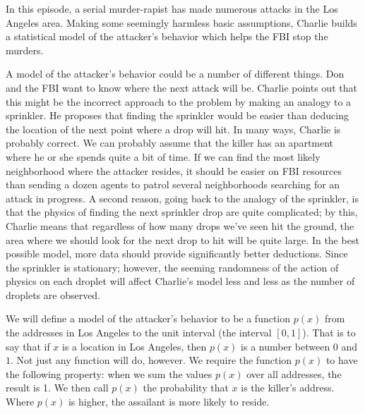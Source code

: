 \newpage
{}
{}
\setcounter{activity}{0}

In this episode, a serial murder-rapist has made numerous attacks in the Los Angeles area. Making some seemingly harmless basic assumptions, Charlie builds a statistical model of the attacker's behavior which helps the FBI stop the murders.




A model of the attacker's behavior could be a number of different things. Don and the FBI want to know where the next attack will be. Charlie points out that this might be the incorrect approach to the problem by making an analogy to a sprinkler. He proposes that finding the sprinkler would be easier than deducing the location of the next point where a drop will hit. In many ways, Charlie is probably correct.  We can probably assume that the killer has an apartment where he or she spends quite a bit of time. If we can find the most likely neighborhood where the attacker resides, it should be easier on FBI resources than sending a dozen agents to patrol several neighborhoods searching for an attack in  progress. A second reason, going back to the analogy of the sprinkler, is that the physics of finding the next sprinkler drop are quite complicated; by this, Charlie means that regardless of how many drops we've seen hit the ground, the area where we should look for the next drop to hit will be quite large. In the best possible model, more data should provide significantly better deductions. Since the sprinkler is stationary; however, the seeming randomness of the action of physics on each droplet will affect Charlie's model less and less as the number of droplets are observed.


We will define a model of the attacker's behavior to be a function $p(x)$ from the addresses in Los Angeles to the unit interval (the interval $[0,1]$). That is to say that if $x$ is a location in Los Angeles, then $p(x)$ is a number between $0$ and $1$.  Not just any function will do, however. We require the function $p(x)$ to have the following property: when we sum the values $p(x)$ over all addresses, the result is 1. We then call $p(x)$ the probability that $x$ is the killer's address. Where $p(x)$ is higher, the assailant is more likely to reside.


